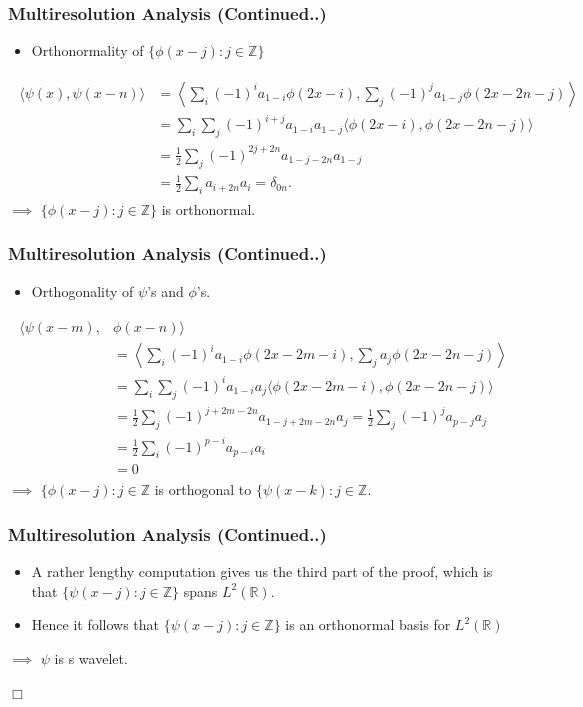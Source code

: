\documentclass{beamer}
\newcommand{\qedwhite}{\hfill \ensuremath{\Box}}
\begin{document}
\begin{frame}
    \frametitle{Multiresolution Analysis (Continued..)}
\begin{itemize}
    \item Orthonormality of $\{\phi(x-j) : j \in  \mathbb{Z}\}$ 
\end{itemize}
\begin{eqnarray*}
    \begin{split}
        \langle \psi(x), \psi(x-n)\rangle &= \left\langle \sum_i (-1)^i a_{1-i}\phi(2x-i),  \sum_j (-1)^ja_{1-j}\phi(2x-2n-j) \right\rangle \\
        &= \sum_i\sum_j (-1)^{i+j}a_{1-i}a_{1-j} \langle \phi(2x-i), \phi(2x-2n-j)\rangle\\
        &= \frac{1}{2} \sum_j  (-1)^{2j+2n}a_{1-j-2n}a_{1-j}\\
        &= \frac{1}{2} \sum_i a_{i+2n}a_i = \delta_{0n}.
    \end{split}
\end{eqnarray*}
$\implies$ $\{\phi(x-j) : j \in  \mathbb{Z}\}$ is orthonormal.
\end{frame}

\begin{frame}
    \frametitle{Multiresolution Analysis (Continued..)}
\begin{itemize}
    \item Orthogonality of $\psi$'s and $\phi$'s.
\end{itemize}
\begin{eqnarray*}
    \begin{split}
        \langle \psi(x-m), & \phi(x-n)\rangle \\
        &= \left\langle \sum_i (-1)^i a_{1-i}\phi(2x-2m-i),  \sum_j a_j\phi(2x-2n-j) \right\rangle \\
        &= \sum_i\sum_j (-1)^{i}a_{1-i}a_j \langle \phi(2x-2m-i), \phi(2x-2n-j)\rangle\\
        &= \frac{1}{2} \sum_j  (-1)^{j+2m-2n}a_{1-j+2m-2n}a_j = \frac{1}{2} \sum_j  (-1)^{j}a_{p-j}a_j\\
        &= \frac{1}{2} \sum_i  (-1)^{p-i}a_{p-i}a_i\\
        &= 0
    \end{split}
\end{eqnarray*}
$\implies$ $\{\phi(x-j) : j \in  \mathbb{Z}$ is orthogonal to $\{\psi(x-k) : j \in  \mathbb{Z}$.
\end{frame}


\begin{frame}
    \frametitle{Multiresolution Analysis (Continued..)}
\begin{itemize}
    \item A rather lengthy computation gives us the third part of the proof, which is that $\{\psi(x-j) : j \in  \mathbb{Z}\}$ spans $L^2(\mathbb{R})$.
    \item Hence it follows that $\{\psi(x-j) : j \in  \mathbb{Z}\}$ is an orthonormal basis for $L^2(\mathbb{R})$
\end{itemize}

$\implies$ $\psi$  is s wavelet.

\qedwhite

\end{frame}
\end{document}
